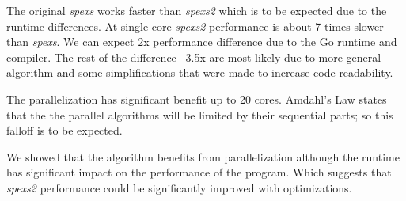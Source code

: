 The original \emph{spexs} works faster than \emph{spexs2} which is to be expected due to the runtime differences. At single core \emph{spexs2} performance is about 7 times slower than \emph{spexs}. We can expect 2x performance difference due to the Go runtime and compiler. The rest of the difference ~3.5x are most likely due to more general algorithm and some simplifications that were made to increase code readability.

The parallelization has significant benefit up to 20 cores. Amdahl's Law \cite{AmdahlsReval} states that the the parallel algorithms will be limited by their sequential parts; so this falloff is to be expected.

We showed that the algorithm benefits from parallelization although the runtime has significant impact on the performance of the program. Which suggests that \emph{spexs2} performance could be significantly improved with optimizations.
